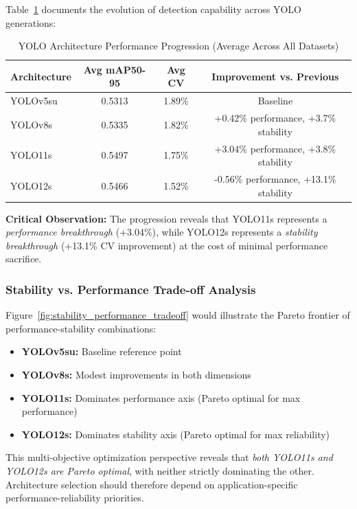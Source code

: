 Table~\ref{tab:architecture_progression} documents the evolution of detection capability across YOLO generations:

\begin{table}[htbp]
\centering
\caption{YOLO Architecture Performance Progression (Average Across All Datasets)}
\label{tab:architecture_progression}
\begin{tabular}{lccc}
\toprule
\textbf{Architecture} & \textbf{Avg mAP50-95} & \textbf{Avg CV} & \textbf{Improvement vs. Previous} \\
\midrule
YOLOv5su  & 0.5313 & 1.89\% & Baseline \\
YOLOv8s   & 0.5335 & 1.82\% & +0.42\% performance, +3.7\% stability \\
YOLO11s   & 0.5497 & 1.75\% & +3.04\% performance, +3.8\% stability \\
YOLO12s   & 0.5466 & 1.52\% & -0.56\% performance, +13.1\% stability \\
\bottomrule
\end{tabular}
\end{table}

\textbf{Critical Observation:} The progression reveals that YOLO11s represents a \textit{performance breakthrough} (+3.04\%), while YOLO12s represents a \textit{stability breakthrough} (+13.1\% CV improvement) at the cost of minimal performance sacrifice.

\subsubsection{Stability vs. Performance Trade-off Analysis}

Figure~\ref{fig:stability_performance_tradeoff} would illustrate the Pareto frontier of performance-stability combinations:

\begin{itemize}
    \item \textbf{YOLOv5su:} Baseline reference point
    \item \textbf{YOLOv8s:} Modest improvements in both dimensions
    \item \textbf{YOLO11s:} Dominates performance axis (Pareto optimal for max performance)
    \item \textbf{YOLO12s:} Dominates stability axis (Pareto optimal for max reliability)
\end{itemize}

This multi-objective optimization perspective reveals that \textit{both YOLO11s and YOLO12s are Pareto optimal}, with neither strictly dominating the other. Architecture selection should therefore depend on application-specific performance-reliability priorities.

